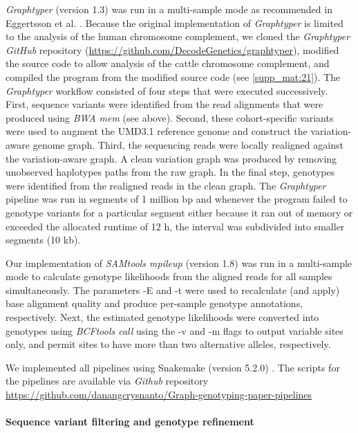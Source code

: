 \documentclass[../main.tex]{subfiles}
\begin{document}
\emph{Graphtyper} (version 1.3) was run in a multi-sample mode as recommended in Eggertsson et al. \citet{eggertsson2017graphtyper}. Because the original implementation of \emph{Graphtyper} is limited to the analysis of the human chromosome complement, we cloned the \emph{Graphtyper GitHub} repository (\url{https://github.com/DecodeGenetics/graphtyper}), modified the source code to allow analysis of the cattle chromosome complement, and compiled the program from the modified source code (see \ref{supp_mat:21}). The \emph{Graphtyper} workflow consisted of four steps that were executed successively. First, sequence variants were identified from the read alignments that were produced using \emph{BWA mem} (see above). Second, these cohort-specific variants were used to augment the UMD3.1 reference genome and construct the variation-aware genome graph. Third, the sequencing reads were locally realigned against the variation-aware graph. A clean variation graph was produced by removing unobserved haplotypes paths from the raw graph. In the final step, genotypes were identified from the realigned reads in the clean graph. The  \emph{Graphtyper} pipeline was run in segments of 1 million bp and whenever the program failed to genotype variants for a particular segment either because it ran out of memory or exceeded the allocated runtime of 12 h, the interval was subdivided into smaller segments (10 kb).

Our implementation of \emph{SAMtools mpileup} (version 1.8) \citep{li2011statistical} was run in a multi-sample mode to calculate genotype likelihoods from the aligned reads for all samples simultaneously. The parameters -E and -t were used to recalculate (and apply) base alignment quality and produce per-sample genotype annotations, respectively. Next, the estimated genotype likelihoods were converted into genotypes using \emph{BCFtools call} using the -v and -m flags to output variable sites only, and permit sites to have more than two alternative alleles, respectively.

We implemented all pipelines using Snakemake (version 5.2.0) \citep{koster2012snakemake}. The scripts for the pipelines are available via \emph{Github} repository \\
\url{https://github.com/danangcrysnanto/Graph-genotyping-paper-pipelines}

\paragraph{Sequence variant filtering and genotype refinement}
\end{document}
